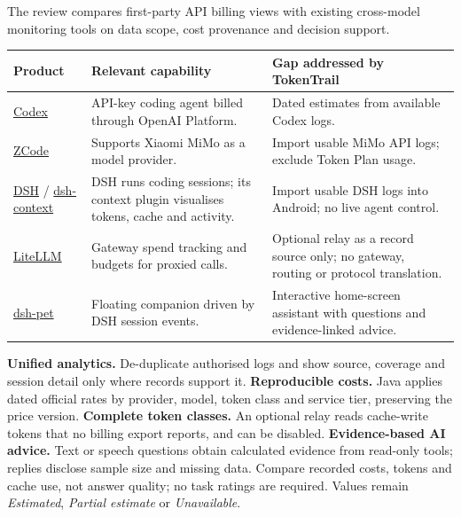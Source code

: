 \documentclass[11pt,a4paper]{article}
\newcommand{\sect}[1]{\vspace{3pt}{\large\bfseries#1}\par\vspace{1pt}}
\begin{document}
\sect{2. Related products and opportunity}
The review compares first-party API billing views with existing cross-model monitoring tools on data scope, cost provenance and decision support.\par
\begin{tabularx}{\linewidth}{@{}>{\raggedright\arraybackslash}p{27mm}Y Y@{}}
\toprule
{}
\textbf{Product} & \textbf{Relevant capability} & \textbf{Gap addressed by TokenTrail} \\
\midrule
\href{https://learn.chatgpt.com/docs/auth}{Codex} & API-key coding agent billed through OpenAI Platform. & Dated estimates from available Codex logs. \\
\href{https://zcode.z.ai/en/docs/configuration}{ZCode} & Supports Xiaomi MiMo as a model provider. & Import usable MiMo API logs; exclude Token Plan usage. \\
\href{https://github.com/deepseek-ai/deepseek-harness}{DSH} / \href{https://github.com/bowenliang123/dsh-context/blob/main/README.md}{dsh-context} & DSH runs coding sessions; its context plugin visualises tokens, cache and activity. & Import usable DSH logs into Android; no live agent control. \\
\href{https://docs.litellm.ai/docs/simple_proxy}{LiteLLM} & Gateway spend tracking and budgets for proxied calls. & Optional relay as a record source only; no gateway, routing or protocol translation. \\
\href{https://github.com/zhu1090093659/dsh-pet/blob/main/README.zh.md}{dsh-pet} & Floating companion driven by DSH session events. & Interactive home-screen assistant with questions and evidence-linked advice. \\
\bottomrule
\end{tabularx}
\sect{3. Proposed contribution}
\textbf{Unified analytics.} De-duplicate authorised logs and show source, coverage and session detail only where records support it. \textbf{Reproducible costs.} Java applies dated official rates by provider, model, token class and service tier, preserving the price version. \textbf{Complete token classes.} An optional relay reads cache-write tokens that no billing export reports, and can be disabled. \textbf{Evidence-based AI advice.} Text or speech questions obtain calculated evidence from read-only tools; replies disclose sample size and missing data. Compare recorded costs, tokens and cache use, not answer quality; no task ratings are required. Values remain \emph{Estimated}, \emph{Partial estimate} or \emph{Unavailable}.
\end{document}
